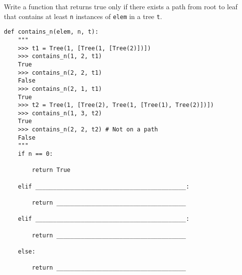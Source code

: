 \begin{blocksection}
\question Write a function that returns true only if there exists a path from root to leaf that contains at least \lstinline$n$ instances of \lstinline$elem$ in a tree \lstinline$t$.

\begin{lstlisting}
def contains_n(elem, n, t):
    """
    >>> t1 = Tree(1, [Tree(1, [Tree(2)])])
    >>> contains_n(1, 2, t1)
    True
    >>> contains_n(2, 2, t1)
    False
    >>> contains_n(2, 1, t1)
    True
    >>> t2 = Tree(1, [Tree(2), Tree(1, [Tree(1), Tree(2)])])
    >>> contains_n(1, 3, t2)
    True
    >>> contains_n(2, 2, t2) # Not on a path
    False
    """
    if n == 0:
		
        return True
				
    elif ___________________________________________:
		
        return _____________________________________
				
    elif ___________________________________________:
		
        return _____________________________________
				
    else:
		
        return _____________________________________
\end{lstlisting}
\end{blocksection}

